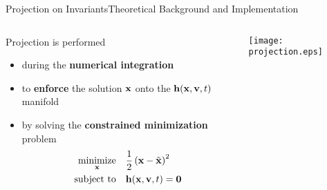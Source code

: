 \begin{frame}{Projection on Invariants}{Theoretical Background and Implementation}
  \vspace{-1.0em}
  \begin{columns}
    \begin{column}[c]{0.6\textwidth}
      Projection is performed
      \begin{itemize}
        \item during the \textbf{numerical integration}
        \item to \textbf{enforce} the solution $\mathbf{x}$ onto the $\mathbf{h}(\mathbf{x}, \mathbf{v}, t)$ manifold
        \item by solving the \textbf{constrained minimization} problem
          \begin{align*}
            \underset{\mathbf{x}}{\text{minimize}} \quad &\dfrac{1}{2}\left(\mathbf{x} - \tilde{\mathbf{x}}\right)^2 \\
            \text{subject to} \quad &\mathbf{h}(\mathbf{x}, \mathbf{v}, t) = \mathbf{0}
          \end{align*}
        \end{itemize}
      \end{column}
      \begin{column}[c]{0.4\textwidth}
        \hspace{-0.2\textwidth}\texttt{[image: projection.eps]}
      \end{column}
    \end{columns}
    \vspace{1.0em}
\end{frame}

